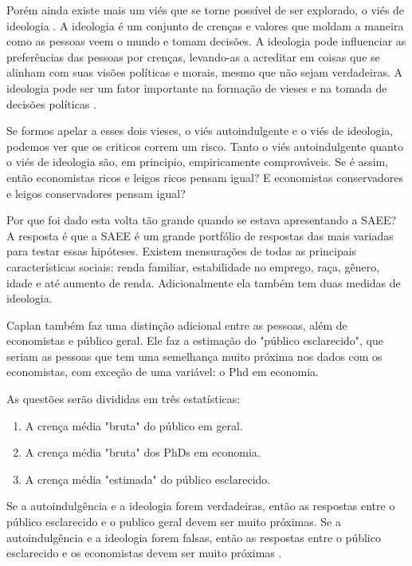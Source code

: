 Porém ainda existe mais um viés que se torne possível de ser explorado, o viés de ideologia \cite{The_Myth_of_the_Rational_Voter}. A ideologia é um conjunto de crenças e valores que moldam a maneira como as pessoas veem o mundo e tomam decisões. A ideologia pode influenciar as preferências das pessoas por crenças, levando-as a acreditar em coisas que se alinham com suas visões políticas e morais, mesmo que não sejam verdadeiras. A ideologia pode ser um fator importante na formação de vieses e na tomada de decisões políticas \cite{The_Myth_of_the_Rational_Voter}.

Se formos apelar a esses dois vieses, o viés autoindulgente e o viés de ideologia, podemos ver que os criticos correm um risco. Tanto o viés autoindulgente quanto o viés de ideologia são, em principio, empiricamente comprováveis. Se é assim, então economistas ricos e leigos ricos pensam igual? E economistas conservadores e leigos conservadores pensam igual? 

Por que foi dado esta volta tão grande quando se estava apresentando a SAEE? A resposta é que a SAEE é um grande portfólio de respostas das mais variadas para testar essas hipóteses. Existem mensurações de todas as principais características sociais: renda familiar, estabilidade no emprego, raça, gênero, idade e até aumento de renda. Adicionalmente ela também tem duas medidas de ideologia.

Caplan também faz uma distinção adicional entre as pessoas, além de economistas e público geral. Ele faz a estimação do "público esclarecido", que seriam as pessoas que tem uma semelhança muito próxima nos dados com os economistas, com exceção de uma variável: o Phd em economia.

As questões serão divididas em três estatísticas:

\begin{enumerate}
    \item A crença média "bruta" do público em geral.
    \item A crença média "bruta" dos PhDs em economia.
    \item A crença média "estimada" do público esclarecido.
\end{enumerate}

Se a autoindulgência e a ideologia forem verdadeiras, então as respostas entre o público esclarecido e o publico geral devem ser muito próximas. Se a autoindulgência e a ideologia forem falsas, então as respostas entre o público esclarecido e os economistas devem ser muito próximas \cite{The_Myth_of_the_Rational_Voter}.

